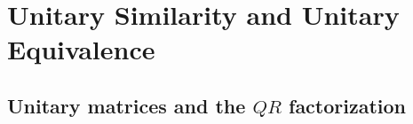 \section{Unitary Similarity and Unitary Equivalence}

\subsection{Unitary matrices and the $QR$ factorization}

